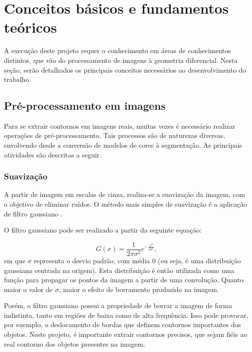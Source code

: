\documentclass[
	12pt,				%
	oneside,			%
	a4paper,			%
	sumario=tradicional,
	english,			%
	french,				%
	spanish,			%
	brazil,				%
]{abntex2}
\begin{document}
\chapter{Conceitos básicos e fundamentos teóricos}

A execução deste projeto requer o conhecimento em áreas de conhecimentos distintos, que vão do processamento de imagens à geometria diferencial.  Nesta seção, serão detalhados os principais conceitos necessários ao desenvolvimento do trabalho.

\section{Pré-processamento em imagens}

Para se extrair contornos em imagens reais, muitas vezes é necessário realizar operações de pré-processamento.  Tais processos são de naturezas diversas, envolvendo desde a conversão de modelos de cores à segmentação. As principais atividades são descritas a seguir. 

\subsection{Suavização}

A partir de imagem em escalas de cinza, realiza-se a suavização da imagem, com o objetivo de eliminar ruídos. O método mais simples de suavização é a aplicação de filtro gaussiano \cite{szeliski}.

O filtro gaussiano pode ser realizado a partir da seguinte equação:

$$G(x) = \frac{1}{2\pi\sigma^2}e^{-\frac{x^2}{2\sigma^2}},$$ em que $\sigma$ representa o desvio padrão, com média 0 (ou seja, é uma distribuição gaussiana centrada na origem). Esta distribuição é então utilizada como uma função para propagar os pontos da imagem a partir de uma convolução. Quanto maior o valor de $\sigma$, maior o efeito de borramento produzido na imagem.

Porém, o filtro gaussiano possui a propriedade de borrar a imagem de forma indistinta, tanto em regiões de baixa como de alta frequência. Isso pode provocar, por exemplo, o deslocamento de bordas que definem contornos importantes dos objetos. Neste projeto, é importante extrair contornos precisos, que sejam fiéis ao real contorno dos objetos presentes na imagem.
\end{document}
